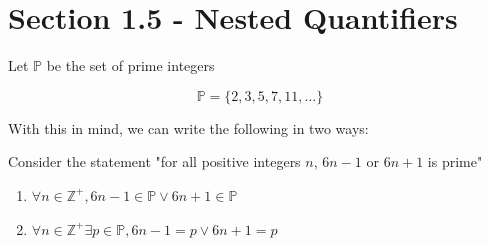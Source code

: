 \documentclass[../../Main.tex]{subfiles}
\begin{document}
\section{Section 1.5 - Nested Quantifiers}

Let $\mathbb{P}$ be the set of prime integers

$$\mathbb{P} = \{ 2, 3, 5, 7, 11, \ldots \}$$

With this in mind, we can write the following in two ways:

\begin{center}
    Consider the statement "for all positive integers $n$, $6n - 1$ or $6n + 1$ is prime"
\end{center}

\begin{enumerate}
    \item $\forall n \in \mathbb{Z}^+, 6n - 1 \in \mathbb{P} \lor 6n + 1 \in \mathbb{P}$
    \item $\forall n \in \mathbb{Z}^+ \exists p \in \mathbb{P}, 6n - 1 = p \lor 6n + 1 = p$
\end{enumerate}
\end{document}
